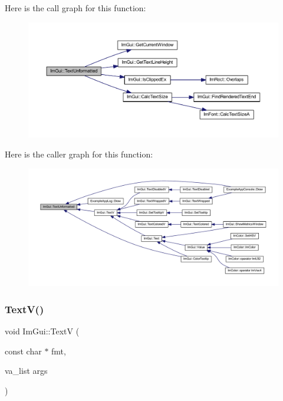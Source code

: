 Here is the call graph for this function\+:
\nopagebreak
\begin{figure}[H]
\begin{center}
\leavevmode
\includegraphics[width=350pt]{namespace_im_gui_a96a5f42789ecc419b2ae8af7b2acc28e_cgraph}
\end{center}
\end{figure}
Here is the caller graph for this function\+:
\nopagebreak
\begin{figure}[H]
\begin{center}
\leavevmode
\includegraphics[width=350pt]{namespace_im_gui_a96a5f42789ecc419b2ae8af7b2acc28e_icgraph}
\end{center}
\end{figure}
\mbox{\label{namespace_im_gui_a10a0d6362178c2f743092f21e1b6cd20}} 
\subsubsection{\texorpdfstring{Text\+V()}{TextV()}}
{\footnotesize\ttfamily void Im\+Gui\+::\+TextV (\begin{DoxyParamCaption}\item[{const char $\ast$}]{fmt,  }\item[{va\+\_\+list}]{args }\end{DoxyParamCaption})}

